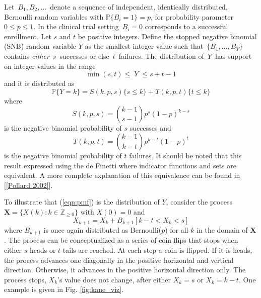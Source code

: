 \documentclass[12pt]{article}         %
\begin{document}
Let $\,B_1, B_2, \ldots \,$ denote a sequence of independent, identically 
distributed, Bernoulli random variables with $\mathbb{P}\{B_i=1\}=p$, for 
probability parameter $0\leq p \leq 1$. In the clinical trial setting 
$\,B_i = 0$ corresponds to a successful enrollment. 
Let $s$ and $t$ be positive integers. 
Define the stopped negative binomial (SNB) random variable $Y$ as the smallest 
integer value such that $\,\{B_1, \ldots , B_Y\}\,$ contains {\em either} 
$\,s\,$ successes or else $\,t\,$ failures. The distribution of $\,Y\,$ has 
support on integer values in the range 
\begin{equation*}                                     %
     \min(s,t) \leq \; Y \;\leq s+t-1  \label{range.y.eq}
\end{equation*}
and it is distributed as
\begin{equation} \label{eqn:pmf}
\mathbb{P}\{Y=k\} = S(k, p, s)  \{s \leq k\} + T(k, p, t) \{t \leq k \} 
\end{equation}
where
\begin{equation} \label{eqn:N}
S(k, p, s) = {k-1 \choose s-1} p^s (1-p)^{k-s} 
\end{equation}
is the negative binomial probability of $s$ successes and
\begin{equation} \label{eqn:R}
T(k, p, t) = {k-1 \choose k-t} p^{k-t} (1-p)^t
\end{equation}
is the negative binomial probability of $t$ failures. It should be noted that
this result expressed using the de Finetti where indicator functions and
sets are equivalent. A more complete explanation of this equivalence can be 
found in [\ref{Pollard 2002}]. 


To illustrate that (\ref{eqn:pmf}) is the distribution of $Y$, consider the 
process $\mathbf{X} = \{X(k) : k \in \mathbb{Z}_{\ge 0} \}$ with $X(0)=0$ and
\begin{equation*} \label{eqn:proc}
X_{k+1} = X_k + B_{k+1} \left[ k-t < X_k < s \right]
\end{equation*}
where $B_{k+1}$ is once again distributed as Bernoulli($p$) for all $k$ in the domain of $\mathbf{X}$. The process can be conceptualized as a series of coin flips that stops when either $s$ heads or $t$ tails are reached. At each step a coin is flipped. If it is heads, the process advances one diagonally in the positive horizontal and vertical direction. Otherwise, it advances in the positive horizontal direction only. The process stops, $X_k$'s value does not change, after either $X_k = s$ or $X_k = k-t$. One example is given in Fig. \ref{fig:kane_viz}.
\end{document}
